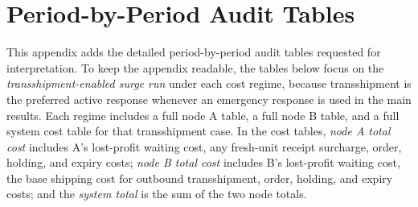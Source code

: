 \documentclass[11pt]{article}
\begin{document}
\section{Period-by-Period Audit Tables}
This appendix adds the detailed period-by-period audit tables requested for interpretation. To keep the appendix readable, the tables below focus on the \emph{transshipment-enabled surge run} under each cost regime, because transshipment is the preferred active response whenever an emergency response is used in the main results. Each regime includes a full node A table, a full node B table, and a full system cost table for that transshipment case. In the cost tables, \emph{node A total cost} includes A's lost-profit waiting cost, any fresh-unit receipt surcharge, order, holding, and expiry costs; \emph{node B total cost} includes B's lost-profit waiting cost, the base shipping cost for outbound transshipment, order, holding, and expiry costs; and the \emph{system total} is the sum of the two node totals.
\end{document}
